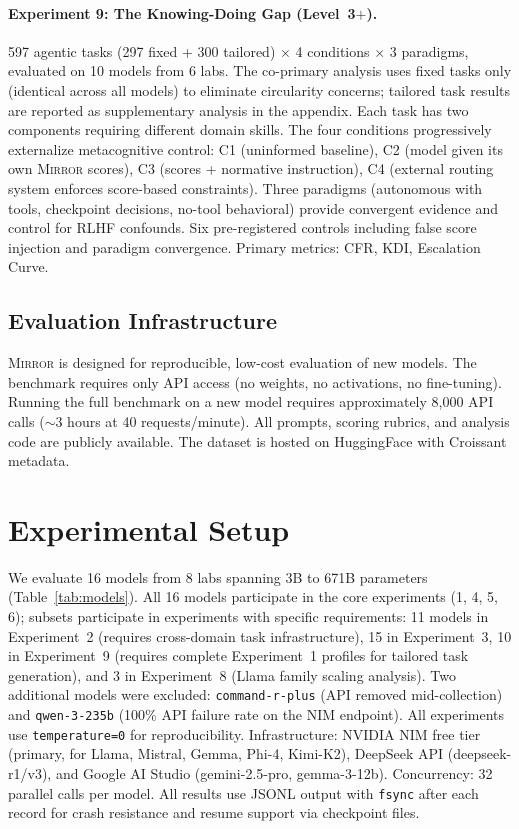 \documentclass[10pt]{article}
\newcommand{\mirror}{\textsc{Mirror}}
\newcommand{\KDI}{KDI}
\newcommand{\CFR}{CFR}
\begin{document}
\paragraph{Experiment 9: The Knowing-Doing Gap (Level~3$+$).}
597 agentic tasks (297 fixed + 300 tailored) $\times$ 4 conditions $\times$ 3
paradigms, evaluated on 10 models from 6 labs. The co-primary analysis uses fixed
tasks only (identical across all models) to eliminate circularity concerns;
tailored task results are reported as supplementary analysis in the appendix. Each task has two components
requiring different domain skills. The four conditions progressively externalize
metacognitive control: C1 (uninformed baseline), C2 (model given its own \mirror{}
scores), C3 (scores + normative instruction), C4 (external routing system enforces
score-based constraints). Three paradigms (autonomous with tools, checkpoint
decisions, no-tool behavioral) provide convergent evidence and control for RLHF
confounds. Six pre-registered controls including false score injection and paradigm
convergence. Primary metrics: \CFR{}, \KDI{}, Escalation Curve.

\subsection{Evaluation Infrastructure}

\mirror{} is designed for reproducible, low-cost evaluation of new models. The
benchmark requires only API access (no weights, no activations, no fine-tuning).
Running the full benchmark on a new model requires approximately 8,000 API calls
($\sim$3 hours at 40 requests/minute). All prompts, scoring rubrics, and analysis
code are publicly available. The dataset is hosted on HuggingFace with Croissant
metadata.

\section{Experimental Setup}
\label{sec:setup}



We evaluate 16 models from 8 labs spanning 3B to 671B parameters
(Table~\ref{tab:models}). All 16 models participate in the core experiments (1, 4, 5, 6); subsets participate in experiments with specific requirements: 11 models in Experiment~2 (requires cross-domain task infrastructure), 15 in Experiment~3, 10 in Experiment~9 (requires complete Experiment~1 profiles for tailored task generation), and 3 in Experiment~8 (Llama family scaling analysis). Two additional models were excluded:
\texttt{command-r-plus} (API removed mid-collection) and \texttt{qwen-3-235b}
(100\% API failure rate on the NIM endpoint). All experiments use
\texttt{temperature=0} for reproducibility. Infrastructure: NVIDIA NIM free tier
(primary, for Llama, Mistral, Gemma, Phi-4, Kimi-K2), DeepSeek API
(deepseek-r1/v3), and Google AI Studio (gemini-2.5-pro, gemma-3-12b).
Concurrency: 32 parallel calls per model. All results use JSONL output with
\texttt{fsync} after each record for crash resistance and resume support via
checkpoint files.
\end{document}
